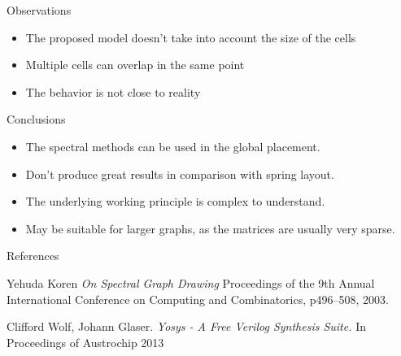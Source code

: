 \documentclass[serif, 12pt]{beamer}
\begin{document}
\begin{frame}{Observations}

\begin{itemize}

\item The proposed model doesn't take into account the size of the cells
\item Multiple cells can overlap in the same point
\item The behavior is not close to reality

\end{itemize}
\end{frame}

\begin{frame}{Conclusions}

\begin{itemize}

\item The spectral methods can be used in the global placement.
\item Don't produce great results in comparison with spring layout.
\item The underlying working principle is complex to understand.
\item May be suitable for larger graphs, as the matrices are usually very 
sparse.

\end{itemize}

\end{frame}

\begin{frame}{References}


\begin{thebibliography}{9}

Yehuda Koren
\textsl{On Spectral Graph Drawing}
Proceedings of the 9th Annual International Conference on Computing and 
Combinatorics, p496--508, 2003.

Clifford Wolf, Johann Glaser.
\textsl{Yosys - A Free Verilog Synthesis Suite.}
In Proceedings of Austrochip 2013

\end{thebibliography}

\end{frame}
\end{document}
